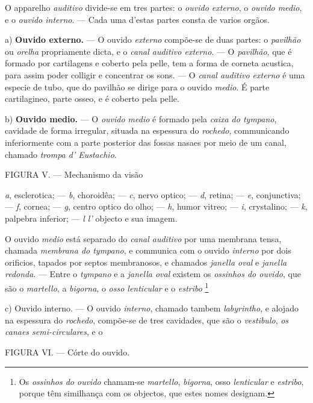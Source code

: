 
 
O apparelho \emph{auditivo} divide-se em tres partes: o \emph{ouvido externo}, o \emph{ouvido medio}, e o \emph{ouvido interno}. --- Cada uma d'estas partes consta de varios orgãos.

a) \textbf{Ouvido externo.} --- O ouvido \emph{externo} compõe-se de duas partes: o \emph{pavilhão} ou \emph{orelha} propriamente dicta, e o \emph{canal auditivo externo}. --- O \emph{pavilhão}, que é formado por cartilagens e coberto pela pelle, tem a forma de corneta acustica, para assim poder colligir e concentrar os sons. --- O \emph{canal auditivo externo} é uma especie de tubo, que do pavilhão se dirige para o ouvido \emph{medio}. É parte cartilagineo, parte osseo, e é coberto pela pelle.

b) \textbf{Ouvido medio.} --- O \emph{ouvido medio} é formado pela \emph{caixa do tympano}, cavidade de forma irregular, situada na espessura do \emph{rochedo}, communicando inferiormente com a parte posterior das fossas nasaes por meio de um canal, chamado \emph{trompa d' Eustachio}.

FIGURA V. --- Mechanismo da visão

\emph{a}, esclerotica; --- \emph{b}, choroidêa; --- \emph{c}, nervo optico; --- \emph{d}, retina; --- \emph{e}, conjunctiva; --- \emph{f}, cornea; --- \emph{g}, centro optico do olho; --- \emph{h}, humor vitreo; --- \emph{i}, crystalino; --- \emph{k}, palpebra inferior; --- \emph{l l'} objecto e sua imagem.

O ouvido \emph{medio} está separado do \emph{canal auditivo} por uma membrana tensa, chamada \emph{membrana do tympano}, e communica com o ouvido \emph{interno} por dois orificios, tapados por septos membranosos, e chamados \emph{janella oval} e \emph{janella redonda}. --- Entre o \emph{tympano} e a \emph{janella oval} existem os \emph{ossinhos do ouvido}, que são o \emph{martello}, a \emph{bigorna}, o \emph{osso lenticular} e o \emph{estribo} \footnote{Os \emph{ossinhos do ouvido} chamam-se \emph{martello}, \emph{bigorna}, osso \emph{lenticular} e \emph{estribo}, porque têm similhança com os objectos, que estes nomes designam.}

c) Ouvido interno. --- O ouvido \emph{interno}, chamado tambem \emph{labyrintho}, e alojado na espessura do \emph{rochedo}, compõe-se de tres cavidades, que são o \emph{vestibulo}, \emph{os canaes semi-circulares}, e o

FIGURA VI. --- Córte do ouvido.

